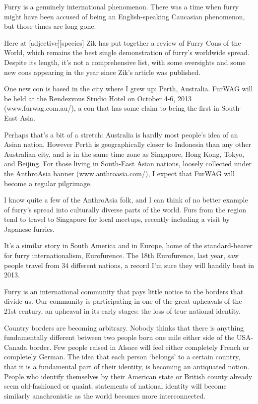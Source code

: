 
Furry is a genuinely international phenomenon. There was a time when furry might have been accused of being an English-speaking Caucasian phenomenon, but those times are long gone.

Here at [adjective][species] Zik has put together a review of Furry Cons of the World, which remains the best single demonstration of furry's worldwide spread. Despite its length, it's not a comprehensive list, with some oversights and some new cons appearing in the year since Zik's article was published.

One new con is based in the city where I grew up: Perth, Australia. FurWAG will be held at the Rendezvous Studio Hotel on October 4-6, 2013 (www.furwag.com.au/), a con that has some claim to being the first in South-East Asia.

Perhaps that's a bit of a stretch: Australia is hardly most people's idea of an Asian nation. However Perth is geographically closer to Indonesia than any other Australian city, and is in the same time zone as Singapore, Hong Kong, Tokyo, and Beijing. For those living in South-East Asian nations, loosely collected under the AnthroAsia banner (www.anthroasia.com/), I expect that FurWAG will become a regular pilgrimage.

I know quite a few of the AnthroAsia folk, and I can think of no better example of furry's spread into culturally diverse parts of the world. Furs from the region tend to travel to Singapore for local meetups, recently including a visit by Japanese furries.

It's a similar story in South America and in Europe, home of the standard-bearer for furry internationalism, Eurofurence. The 18th Eurofurence, last year, saw people travel from 34 different nations, a record I'm sure they will handily beat in 2013.

Furry is an international community that pays little notice to the borders that divide us. Our community is participating in one of the great upheavals of the 21st century, an upheaval in its early stages: the loss of true national identity.

Country borders are becoming arbitrary. Nobody thinks that there is anything fundamentally different between two people born one mile either side of the USA-Canada border. Few people raised in Alsace will feel either completely French or completely German. The idea that each person `belongs' to a certain country, that it is a fundamental part of their identity, is becoming an antiquated notion. People who identify themselves by their American state or British county already seem old-fashioned or quaint; statements of national identity will become similarly anachronistic as the world becomes more interconnected.

